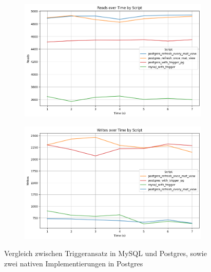 \vspace{-5pt}
\begin{figure}[H]
    \centering
    \begin{subfigure}[t]{0.48\textwidth}
        \includegraphics[width=\textwidth]{PNGs/Script/Views/mat-view-comparison//Reads}
    \end{subfigure}
    \hfill
    \begin{subfigure}[t]{0.48\textwidth}
        \includegraphics[width=\textwidth]{PNGs/Script/Views/mat-view-comparison/Writes}
    \end{subfigure}
    \vspace{-5pt}
    \caption[Views: Beide Triggeransätze sowie materialisierte Sicht]{Vergleich zwischen Triggeransatz in MySQL und Postgres, sowie zwei nativen Implementierungen in Postgres }
    \label{fig:mat-view-comparison-comp-metric}
\end{figure}
\vspace{-15pt}

